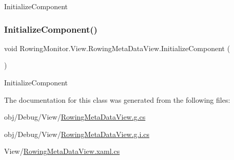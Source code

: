 Initialize\+Component 

\mbox{\label{class_rowing_monitor_1_1_view_1_1_rowing_meta_data_view_a3d445692062269ce977812772d5c4d97}} 
\subsubsection{\texorpdfstring{Initialize\+Component()}{InitializeComponent()}\hspace{0.1cm}{\footnotesize\ttfamily [2/2]}}
{\footnotesize\ttfamily void Rowing\+Monitor.\+View.\+Rowing\+Meta\+Data\+View.\+Initialize\+Component (\begin{DoxyParamCaption}{ }\end{DoxyParamCaption})}



Initialize\+Component 



The documentation for this class was generated from the following files\+:\begin{DoxyCompactItemize}
\item 
obj/\+Debug/\+View/\hyperlink{_rowing_meta_data_view_8g_8cs}{Rowing\+Meta\+Data\+View.\+g.\+cs}\item 
obj/\+Debug/\+View/\hyperlink{_rowing_meta_data_view_8g_8i_8cs}{Rowing\+Meta\+Data\+View.\+g.\+i.\+cs}\item 
View/\hyperlink{_rowing_meta_data_view_8xaml_8cs}{Rowing\+Meta\+Data\+View.\+xaml.\+cs}\end{DoxyCompactItemize}
